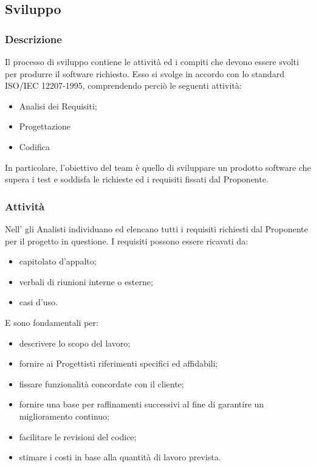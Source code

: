     \subsection{Sviluppo}
        \subsubsection{Descrizione}
        Il processo di sviluppo contiene le attività ed i compiti che devono essere svolti per produrre il software richiesto. Esso si svolge in accordo con lo standard ISO/IEC 12207-1995, comprendendo perciò le seguenti attività:
        \begin{itemize}
        \item{Analisi dei Requisiti;}
        \item{Progettazione}
        \item{Codifica}
        \end{itemize}
	In particolare, l'obiettivo del team è quello di sviluppare un prodotto software che supera i test e soddisfa le richieste ed i requisiti fissati dal Proponente.
        
            \subsubsection{Attività}
           Nell'\AdR{} gli Analisti individuano ed elencano tutti i requisiti richiesti dal Proponente per il progetto in questione. I requisiti possono essere ricavati da:
           \begin{itemize}
           	\item{capitolato d'appalto;}
		\item{verbali di riunioni interne o esterne;}
		\item{casi d'uso.}
           \end{itemize}
           E sono fondamentali per:
            \begin{itemize}
        		\item{descrivere lo scopo del lavoro;}
		\item{fornire ai Progettisti riferimenti specifici ed affidabili;}
		\item{fissare funzionalità concordate con il cliente;}
		\item{fornire una base per raffinamenti successivi al fine di garantire un miglioramento continuo;}
		\item{facilitare le revisioni del codice;}
		\item{stimare i costi in base alla quantità di lavoro prevista.}
        	   \end{itemize}
                 
